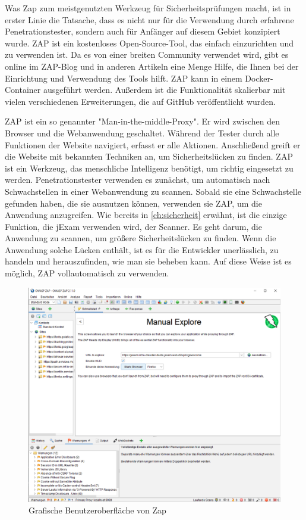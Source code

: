 Was Zap zum meistgenutzten Werkzeug für Sicherheitsprüfungen macht,
ist in erster Linie die Tatsache, dass es nicht nur für die Verwendung
durch erfahrene Penetrationstester, sondern auch für Anfänger auf diesem
Gebiet konzipiert wurde. ZAP ist ein kostenloses Open-Source-Tool, das
einfach einzurichten und zu verwenden ist. Da es von einer breiten Community
verwendet wird, gibt es online im ZAP-Blog und in anderen Artikeln eine Menge
Hilfe, die Ihnen bei der Einrichtung und Verwendung des Tools hilft.
ZAP kann in einem Docker-Container ausgeführt werden. Außerdem ist die
Funktionalität skalierbar mit vielen verschiedenen Erweiterungen, die
auf GitHub veröffentlicht wurden.


ZAP ist ein so genannter "Man-in-the-middle-Proxy". Er wird zwischen den
Browser und die Webanwendung geschaltet. Während der Tester durch alle
Funktionen der Website navigiert, erfasst er alle Aktionen. Anschließend
greift er die Website mit bekannten Techniken an, um Sicherheitslücken zu
finden.  ZAP ist ein Werkzeug, das menschliche Intelligenz benötigt,
um richtig eingesetzt zu werden.
Penetrationstester verwenden es zunächst, um automatisch nach Schwachstellen
in einer Webanwendung zu scannen. Sobald sie eine Schwachstelle gefunden
haben, die sie ausnutzen können, verwenden sie ZAP, um die Anwendung
anzugreifen. Wie bereits in \autoref{ch:sicherheit} erwähnt, ist die einzige Funktion,
die jExam verwenden wird, der Scanner. Es geht darum, die Anwendung zu
scannen, um größere Sicherheitslücken zu finden.  Wenn die Anwendung solche
Lücken enthält, ist es für die Entwickler unerlässlich, zu handeln und
herauszufinden, wie man sie beheben kann. Auf diese Weise ist es möglich,
ZAP vollautomatisch zu verwenden.


\begin{figure}[H]
    \centering
    \includegraphics[scale=0.5]{images/zap-interface}
    \caption{Grafische Benutzeroberfläche von Zap} \label{fig:zap-interface}
\end{figure}


